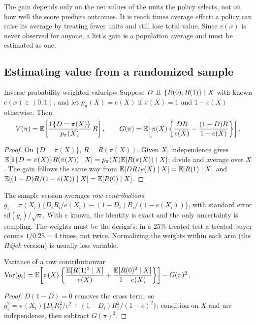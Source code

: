 \documentclass[11pt]{article}
\begin{document}
The gain depends only on the net values of the units the policy selects, not on how well the score predicts
outcomes. It is reach times average effect: a policy can raise its average by treating fewer units and still lose
total value. Since $v(x)$ is never observed for anyone, a list's gain is a population average and must be
estimated as one.

\subsection{Estimating value from a randomized sample}

\begin{prop}{Inverse-probability-weighted value}{ipw}
Suppose $D \perp\!\!\!\perp \{R(0), R(1)\} \mid X$ with known $e(x) \in (0,1)$, and let $p_\pi(X) = e(X)$ if $\pi(X) = 1$ and
$1 - e(X)$ otherwise. Then
\[
  V(\pi) = \mathbb{E}\!\left[\frac{\mathbf{1}\{D = \pi(X)\}}{p_\pi(X)}\,R\right], \qquad
  G(\pi) = \mathbb{E}\!\left[\pi(X)\left\{\frac{DR}{e(X)} - \frac{(1-D)R}{1-e(X)}\right\}\right].
\]
\end{prop}
\begin{proof}
On $\{D = \pi(X)\}$, $R = R(\pi(X))$. Given $X$, independence gives
$\mathbb{E}[\mathbf{1}\{D = \pi(X)\}R(\pi(X)) \mid X] = p_\pi(X)\mathbb{E}[R(\pi(X)) \mid X]$; divide and average over $X$. The gain follows the
same way from $\mathbb{E}[DR/e(X) \mid X] = \mathbb{E}[R(1) \mid X]$ and $\mathbb{E}[(1-D)R/(1-e(X)) \mid X] = \mathbb{E}[R(0) \mid X]$.
\end{proof}

The sample version averages \emph{row contributions}
$g_i = \pi(X_i)\{D_iR_i/e(X_i) - (1-D_i)R_i/(1-e(X_i))\}$, with standard error $\text{sd}(g_i)/\sqrt n$. With $e$ known,
the identity is exact and the only uncertainty is sampling. The weights must be the design's: in a 25\%-treated
test a treated buyer counts $1/0.25 = 4$ times, not twice. Normalizing the weights within each arm (the
\emph{H\'ajek} version) is usually less variable.

\begin{prop}{Variance of a row contribution}{var}
$\operatorname{Var}(g_i) = \mathbb{E}\!\left[\pi(X)\left\{\dfrac{\mathbb{E}[R(1)^2 \mid X]}{e(X)} + \dfrac{\mathbb{E}[R(0)^2 \mid X]}{1-e(X)}\right\}\right] - G(\pi)^2$.
\end{prop}
\begin{proof}
$D(1-D) = 0$ removes the cross term, so $g_i^2 = \pi(X_i)\{D_iR_i^2/e^2 + (1-D_i)R_i^2/(1-e)^2\}$; condition on $X$ and
use independence, then subtract $G(\pi)^2$.
\end{proof}
\end{document}
